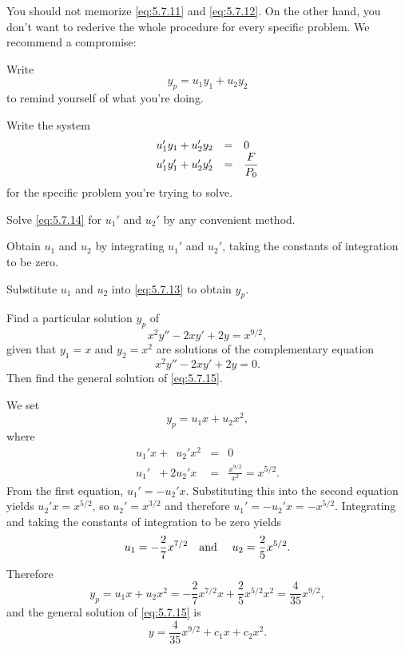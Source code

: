 You should not memorize \eqref{eq:5.7.11} and \eqref{eq:5.7.12}. On the other hand, you don't want
to rederive the whole procedure for every specific problem. We recommend a compromise:
\begin{alist}
  \item %
  Write
  \begin{equation}
    \label{eq:5.7.13}y_{p}=u_{1}y_{1}+u_{2}y_{2}
  \end{equation}
  to remind yourself of what you're doing.

  \item %
  Write the system
  \begin{equation}
    \label{eq:5.7.14}
    \begin{array}{rcl}
      u_{1}'y_{1}+u_{2}'y_{2}   & = & 0                   \\
      u_{1}'y_{1}'+u_{2}'y_{2}' & = & \displaystyle\frac{F}{P_{0}}
    \end{array}
  \end{equation}
  for the specific problem you're trying to solve.

  \item %
  Solve \eqref{eq:5.7.14} for $u_{1}'$ and $u_{2}'$ by any convenient method.

  \item %
  Obtain $u_{1}$ and $u_{2}$ by integrating $u_{1}'$ and $u_{2}'$, taking the constants of
  integration to be zero.

  \item %
  Substitute $u_{1}$ and $u_{2}$ into \eqref{eq:5.7.13} to obtain $y_{p}$.
\end{alist}

\begin{example}
  \label{example:5.7.1} \rm Find a particular solution $y_{p}$ of
  \begin{equation}
    \label{eq:5.7.15}x^{2}y''-2xy'+2y=x^{9/2},
  \end{equation}
  given that $y_{1}=x$ and $y_{2}=x^{2}$ are solutions of the complementary equation
  \[
    x^{2}y''-2xy'+2y=0.
  \]
  Then find the general solution of \eqref{eq:5.7.15}.
\end{example}

\begin{examplesolution}
\solution We set
\[
  y_{p}=u_{1}x+u_{2}x^{2},
\]
where
\begin{eqnarray*}
  u_{1}'x+\phantom{2}u_{2}'x^{2}           & = & 0 \\
  u_{1}'\phantom{x}+2u_{2}'x\phantom{^{2}} & = & \frac{x^{9/2}}{x^{2}}=x^{5/2}.
\end{eqnarray*}
From the first equation, $u_{1}'=-u_{2}'x$. Substituting this into the second equation yields
$u_{2}'x=x^{5/2}$, so $u_{2}'=x^{3/2}$ and therefore $u_{1}'=-u_{2}'x=-x^{5/2}$. Integrating and
taking the constants of integration to be zero yields
\[
  u_{1}=-\frac{2}{7}x^{7/2}\mbox{\quad and \quad}u_{2}=\frac{2}{5}x^{5/2}.
\]
Therefore
\[
  y_{p}=u_{1}x+u_{2}x^{2}=-\frac{2}{7}x^{7/2}x+\frac{2}{5}x^{5/2}x^{2}=\frac{4}{35}x^{9/2},
\]
and the general solution of \eqref{eq:5.7.15} is
\[
  y=\frac{4}{35}x^{9/2}+c_{1}x+c_{2}x^{2}.
\]
\end{examplesolution}

